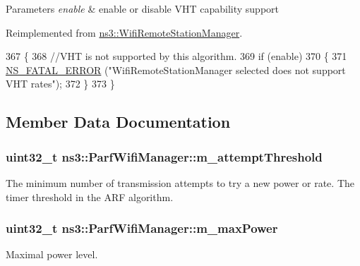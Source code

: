 \begin{DoxyParams}{Parameters}
{\em enable} & enable or disable V\+HT capability support \\
\hline
\end{DoxyParams}


Reimplemented from \hyperlink{classns3_1_1WifiRemoteStationManager_a149cf907f831f80e22162624a01f6c1a}{ns3\+::\+Wifi\+Remote\+Station\+Manager}.


\begin{DoxyCode}
367 \{
368   \textcolor{comment}{//VHT is not supported by this algorithm.}
369   \textcolor{keywordflow}{if} (enable)
370     \{
371       \hyperlink{group__fatal_ga5131d5e3f75d7d4cbfd706ac456fdc85}{NS\_FATAL\_ERROR} (\textcolor{stringliteral}{"WifiRemoteStationManager selected does not support VHT rates"});
372     \}
373 \}
\end{DoxyCode}


\subsection{Member Data Documentation}
\subsubsection[{\texorpdfstring{m\+\_\+attempt\+Threshold}{m_attemptThreshold}}]{\setlength{\rightskip}{0pt plus 5cm}uint32\+\_\+t ns3\+::\+Parf\+Wifi\+Manager\+::m\+\_\+attempt\+Threshold\hspace{0.3cm}{\ttfamily [private]}}\hypertarget{classns3_1_1ParfWifiManager_aab9760bab8628fc4822c12b2dd2bf0ea}{}\label{classns3_1_1ParfWifiManager_aab9760bab8628fc4822c12b2dd2bf0ea}


The minimum number of transmission attempts to try a new power or rate. The \textquotesingle{}timer\textquotesingle{} threshold in the A\+RF algorithm. 

\subsubsection[{\texorpdfstring{m\+\_\+max\+Power}{m_maxPower}}]{\setlength{\rightskip}{0pt plus 5cm}uint32\+\_\+t ns3\+::\+Parf\+Wifi\+Manager\+::m\+\_\+max\+Power\hspace{0.3cm}{\ttfamily [private]}}\hypertarget{classns3_1_1ParfWifiManager_a6894ea0155e04eab0db55007342d5a78}{}\label{classns3_1_1ParfWifiManager_a6894ea0155e04eab0db55007342d5a78}
Maximal power level. 
